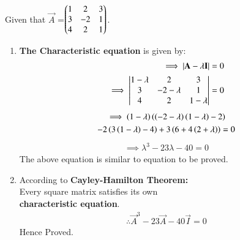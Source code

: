Given that $\vec{A}$ =$\begin{pmatrix}1&2&3\\3&-2&1\\4&2&1\end{pmatrix}$.
\begin{enumerate}
\item \textbf{The Characteristic equation} is given by:
\begin{align}
  \implies  \left\vert\mathbf{A}-\lambda\mathbf{I}\right\vert&=0
    \\
    \implies \begin{vmatrix}1-\lambda&2&3\\3&-2-\lambda&1\\4&2&1-\lambda\end{vmatrix}&=0
    \end{align}
\begin{multline}
   \implies\left(1-\lambda\right)\left(\left(-2-\lambda\right)\left(1-\lambda\right)-2\right)
   \\
   -2\left(3\left(1-\lambda\right)-4\right)+3\left(6+4\left(2+\lambda\right)\right)=0
\end{multline}
\begin{align}
 \implies   \lambda^3-23\lambda-40=0
\end{align}
The above equation is similar to equation to be proved.
\item According to \textbf{Cayley-Hamilton Theorem:} 
\\
Every square matrix satisfies its own
\\\textbf{characteristic equation}.
\begin{align}
\therefore    \vec{A}^3-23\vec{A}-40\vec{I}=0
\end{align}
Hence Proved.
\end{enumerate}
